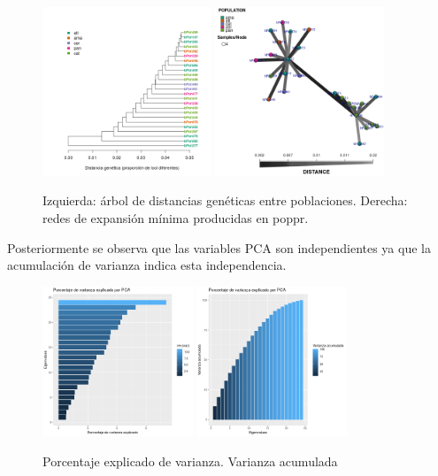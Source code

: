 \documentclass{article}
\begin{document}
\begin{figure}[h]
    \centering
    \includegraphics[width=0.45\textwidth]{arbol_jaguar.png}
    \includegraphics[width=0.45\textwidth]{grafo_red_jaguar.png}
    \caption{Izquierda: árbol de distancias genéticas entre poblaciones. Derecha: redes de expansión mínima producidas en poppr.}
    \label{fig:tree1}
\end{figure}


Posteriormente se observa que las variables PCA son independientes ya que la acumulación de varianza indica esta independencia.

\begin{figure}[h]
    \centering
    \includegraphics[width=0.4\textwidth]{PCA_var.png}
    \includegraphics[width=0.4\textwidth]{PCA_var_acumulada.png}
    \caption{Porcentaje explicado de varianza. Varianza acumulada}
    \label{fig:PCA_var}
\end{figure}
\end{document}
